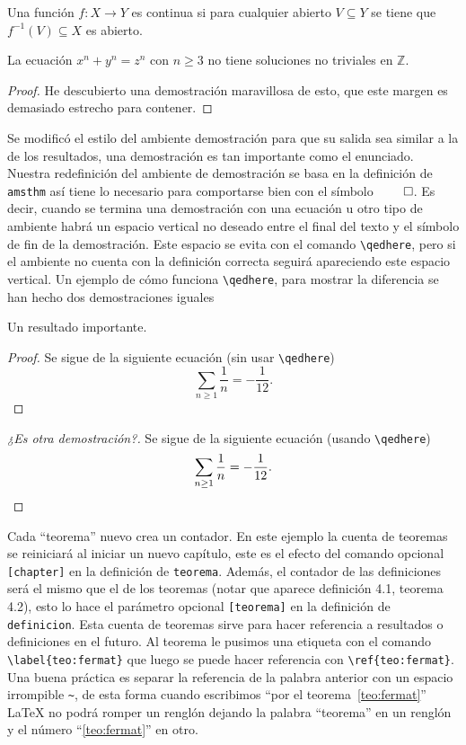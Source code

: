 \begin{definicion}
  Una función \(f\colon X\to Y\) es continua si para cualquier abierto
  \(V\subseteq Y\) se tiene que \(f^{-1}(V)\subseteq X\) es abierto.
\end{definicion}

\begin{teorema}[Fermat]%
\label{teo:fermat}
  La ecuación \(x^n + y^n = z^n\) con \(n\geq 3\) no tiene soluciones no triviales en \(\mathbb{Z}\).
\end{teorema}
\begin{proof}
  He descubierto una demostración maravillosa de esto, que este margen es
  demasiado estrecho para contener.
\end{proof}

Se modificó el estilo del ambiente demostración para que su salida sea
similar a la de los resultados, una demostración es tan importante como el
enunciado. Nuestra redefinición del ambiente de demostración se basa en la
definición de \texttt{amsthm} así tiene lo necesario para comportarse bien
con el símbolo \(\qed \). Es decir, cuando se termina una demostración con
una ecuación u otro tipo de ambiente habrá un espacio vertical no deseado
entre el final del texto y el símbolo de fin de la demostración. Este
espacio se evita con el comando \verb|\qedhere|, pero si el ambiente no
cuenta con la definición correcta seguirá apareciendo este espacio vertical.
Un ejemplo de cómo funciona \verb|\qedhere|, para mostrar la diferencia se
han hecho dos demostraciones iguales

\begin{teorema}
  Un resultado importante.
\end{teorema}
\begin{proof}
  Se sigue de la siguiente ecuación (sin usar \verb|\qedhere|)
  \[
    \sum_{n\geq 1}\frac{1}{n}=-\frac{1}{12}.
  \]
\end{proof}
\begin{proof}[¿Es otra demostración?]
  Se sigue de la siguiente ecuación (usando \verb|\qedhere|)
  \[
    \sum_{n\geq 1}\frac{1}{n}=-\frac{1}{12}. \qedhere
  \]
\end{proof}

Cada \enquote{teorema} nuevo crea un contador. En este ejemplo la cuenta de
teoremas se reiniciará al iniciar un nuevo capítulo, este es el efecto del
comando opcional \texttt{[chapter]} en la definición de \texttt{teorema}.
Además, el contador de las definiciones será el mismo que el de los teoremas
(notar que aparece definición 4.1, teorema 4.2), esto lo hace el parámetro
opcional \texttt{[teorema]} en la definición de \texttt{definicion}. Esta
cuenta de teoremas sirve para hacer referencia a resultados o definiciones
en el futuro. Al teorema le pusimos una etiqueta con el comando
\verb|\label{teo:fermat}| que luego se puede hacer referencia con
\verb|\ref{teo:fermat}|. Una buena práctica es separar la referencia de la
palabra anterior con un espacio irrompible \verb|~|, de esta forma cuando
escribimos \enquote{por el teorema~\ref{teo:fermat}} \LaTeX{} no podrá romper un
renglón dejando la palabra \enquote{teorema} en un renglón y el número
\enquote{\ref{teo:fermat}} en otro.

